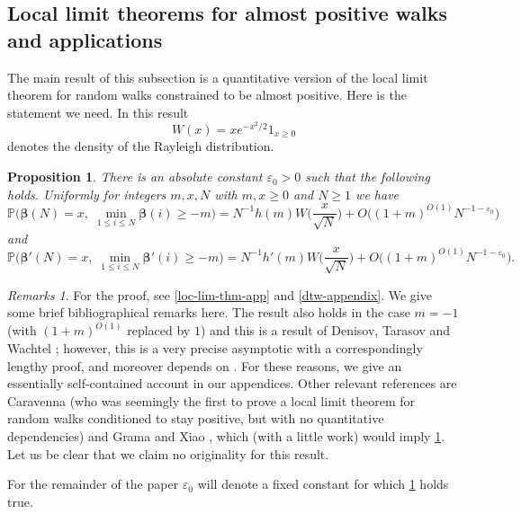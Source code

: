 \documentclass[11pt,reqno]{amsart}
\numberwithin{equation}{section}
\newtheorem{proposition}[theorem]{Proposition}
\theoremstyle{definition}
\theoremstyle{remark}
\newtheorem*{remarks}{Remarks}
\newcommand{\mb}{\mathbb}
\newcommand{\eps}{\varepsilon}
\def\boldbeta{\boldsymbol\beta}
\renewcommand{\le}{\leqslant}
\renewcommand{\ge}{\geqslant}
\begin{document}
\subsection{Local limit theorems for almost positive walks and applications}
The main result of this subsection is a quantitative version of the local limit theorem for random walks constrained to be almost positive.  Here is the statement we need. In this result \begin{equation}\label{raleigh-intro} W(x) =  x e^{-x^2/2} 1_{x \ge 0}\end{equation} denotes the density of the Rayleigh distribution.
\begin{proposition}\label{lem13.5} There is an absolute constant $\eps_0 > 0$ such that the following holds.
Uniformly for integers $m, x, N$ with $m ,x \ge 0$ and $N \ge 1$ we have
\begin{equation}\label{lem13.5-expr} \mb{P} \big(\boldbeta(N) = x,\; \min_{1 \le i \le N} \boldbeta(i) \ge -m\big) = N^{-1} h(m) W\big(\frac{x}{\sqrt{N}}\big) + O\big((1 + m)^{O(1)} N^{-1 - \eps_0}\big)\end{equation} and
\begin{equation}\label{lem13.5-exprb} \mb{P} \big(\boldbeta'(N) = x,\; \min_{1 \le i \le N} \boldbeta'(i) \ge -m\big) = N^{-1} h'(m) W\big(\frac{x}{\sqrt{N}}\big) + O\big((1 + m)^{O(1)} N^{-1 - \eps_0}\big).\end{equation} 
\end{proposition}
\begin{remarks}
For the proof, see \cref{loc-lim-thm-app} and \cref{dtw-appendix}. We give some brief bibliographical remarks here. The result also holds in the case $m = -1$ (with $(1 + m)^{O(1)}$ replaced by $1$) and this is a result of Denisov, Tarasov and Wachtel \cite[Theorem 1]{DTW24b}; however, this is a very precise asymptotic with a correspondingly lengthy proof, and moreover depends on \cite{DTW24}. For these reasons, we give an essentially self-contained account in our appendices. Other relevant references are Caravenna \cite{caravenna} (who was seemingly the first to prove a local limit theorem for random walks conditioned to stay positive, but with no quantitative dependencies) and Grama and Xiao \cite[Theorem 6.1]{grama-xiao}, which (with a little work) would imply \cref{lem13.5}. Let us be clear that we claim no originality for this result.
    \end{remarks}

For the remainder of the paper $\eps_0$ will denote a fixed constant for which \cref{lem13.5} holds true.
\end{document}
